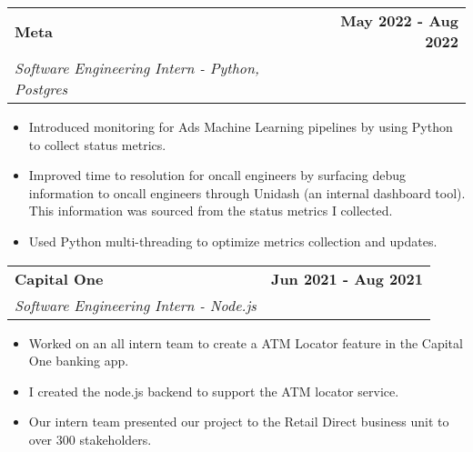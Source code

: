 \documentclass[10pt]{extreport}
\makeatletter
\newcommand{\resumeSubheading}[4]{
  \vspace{-1pt}
    \begin{tabular*}{1.0\textwidth}{l@{\extracolsep{\fill}}r}
      \textbf{#1} & \textbf{#2}  \vspace{1mm} \\
      {#3} & \textbf{#4} \\
    \end{tabular*}\vspace{-3pt}
}
\makeatother
\begin{document}
\resumeSubheading{Meta}{May 2022 - Aug 2022}
    {\textit{Software Engineering Intern - Python, Postgres}}{}
    \vspace{-2mm}
    \begin{itemize}
     \item[\textperiodcentered] Introduced monitoring for Ads Machine Learning pipelines by using Python to collect status metrics.

     \vspace{-2mm}
     \item[\textperiodcentered] Improved time to resolution for oncall engineers by surfacing debug information to oncall engineers through Unidash (an internal dashboard tool). This information was sourced from the status metrics I collected.

     \vspace{-2mm}
     \item[\textperiodcentered] Used Python multi-threading to optimize metrics collection and updates.
    \end{itemize}
    
    \resumeSubheading{Capital One}{Jun 2021 - Aug 2021}
    {\textit{Software Engineering Intern - Node.js}}{}
    \vspace{-2mm}
    \begin{itemize}
    \item[\textperiodcentered] Worked on an all intern team to create a ATM Locator feature in the Capital One banking app.
            \vspace{-2mm}

        \item[\textperiodcentered] I created the node.js backend to support the ATM locator service.
                \vspace{-2mm}

        \item[\textperiodcentered] Our intern team presented our project to the Retail Direct business unit to over 300 stakeholders.
    \end{itemize}
    
\end{document}
